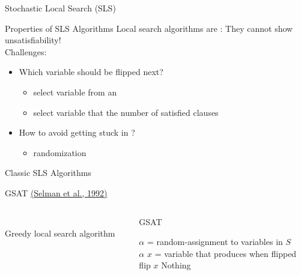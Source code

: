 \documentclass[t]{sdqbeamer}
\begin{document}
\begin{frame}{Stochastic Local Search (SLS)}
\begin{block}{Properties of SLS Algorithms}
	Local search algorithms are : They cannot show unsatisfiability!\\[1em]
	Challenges: 
	\begin{itemize}\setlength{\itemsep}{1ex}
		\item Which variable should be flipped next?
		\begin{itemize}\setlength{\itemsep}{1ex}
		\item<2-> select variable from an 
		\item<2-> select variable that  the number of satisfied clauses
		\end{itemize}
	\item<2-> How to avoid getting stuck in ?
		\begin{itemize}\setlength{\itemsep}{1ex}
		\item<3-> randomization
		\end{itemize}
	\end{itemize}
\end{block}
\end{frame}
	
\begin{frame}{Classic SLS Algorithms}
\begin{block}{GSAT \href{http://dl.acm.org/citation.cfm?id=1867135.1867203}{(Selman et al., 1992)}}
\setlength\columnsep{1ex}
\begin{columns}[T]
	\begin{column}{.3\linewidth}
		~\\ Greedy local search algorithm
	\end{column}
	\begin{column}{.6\linewidth}
	\begin{algorithm}[H]
		\DontPrintSemicolon
		\caption{GSAT}
		\BlankLine
		 {
			$\alpha$ = random-assignment to variables in $S$ \\
			 {
				 {
					\Return $\alpha$
				}
				$x$ = variable that produces  when flipped \\
				flip $x$
			}
		}
		\Return Nothing 
	\end{algorithm}
	\end{column}
\end{columns}
\end{block}
\end{frame}
	
\end{document}

